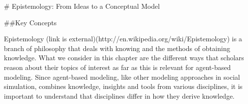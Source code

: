 # Epistemology: From Ideas to a Conceptual Model

##Key Concepts

Epistemology (link is external)(http://en.wikipedia.org/wiki/Epistemology) is a branch of philosophy that deals with knowing and the methods of obtaining knowledge. What we consider in this chapter are the different ways that scholars reason about their topics of interest as far as this is relevant for agent-based modeling. Since agent-based modeling, like other modeling approaches in social simulation, combines knowledge, insights and tools from various disciplines, it is important to understand that disciplines differ in how they derive knowledge.